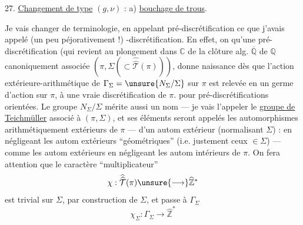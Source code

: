 
27. \uline{Changement de type} $(g,\nu)$ : a) \uline{bouchage de trous}.

Je vais changer de terminologie, en appelant
pré-discrétification ce que j'avais appelé (un peu
péjorativement !) -discrétification. En effet, on
 qu'une pré-discrétification  (qui revient 
au plongement  dans $\mathbb C$ de la clôture alg. $\overline{\mathbb Q}$ de $\mathbb Q$
canoniquement associée  $(\pi,\Sigma(\subset\widehat{\widehat{\mathcal T}}(\pi)))$, donne
naissance dès que l'action extérieure-arithmétique de
$\Gamma_\Sigma=\unsure{N_\Sigma/\Sigma}$ sur $\pi$ est relevée en un germe d'action
sur $\pi$, à une vraie discrétification de $\pi$.  pour
pré-discrétifications orientées. Le groupe $N_\Sigma/\Sigma$ mérite
aussi un nom --- je vais l'appeler le \uline{groupe de}
\uline{Teichmüller}  associé à $(\pi,\Sigma)$, et
ses éléments seront appelés les automorphismes
arithmétiquement extérieurs de $\pi$ ---  d'un
autom extérieur (normalisant $\Sigma$) : en négligeant les
autom extérieurs ``géométriques'' (i.e. justement ceux
$\in\Sigma$) ---  comme les autom extérieurs  
 en négligeant les autom intérieurs de $\pi$.
On  fera attention que le caractère ``multiplicateur''
\[
\chi:\widehat{\widehat{\mathcal T}}(\pi)\unsure{\longrightarrow}\widehat{\mathbb Z}^{*}
\]
est trivial sur $\Sigma$, par construction de $\Sigma$, et
passe à $\Gamma_\Sigma$
\[
\chi_\Sigma:\Gamma_\Sigma\longrightarrow\widehat{\mathbb Z}^{*}
\]
